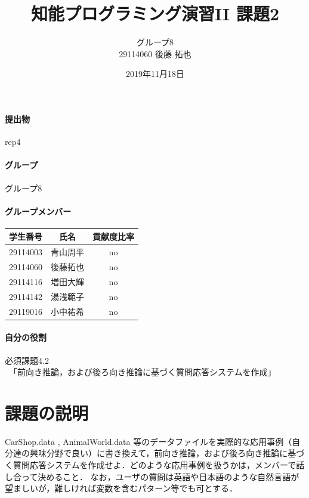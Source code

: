 \documentclass[uplatex,12pt]{jsarticle}
\title{知能プログラミング演習II 課題2}
\author{グループ8\\
  29114060 後藤 拓也\\
}
\date{2019年11月18日}
\begin{document}
\maketitle

\paragraph{提出物} rep4

\paragraph{グループ} グループ8

\paragraph{グループメンバー}
\begin{center}
\begin{tabular}{|c|c|c|}
  \hline
  学生番号&氏名&貢献度比率\\
  \hline\hline
  29114003&青山周平&no\\
  \hline
  29114060&後藤拓也&no\\
  \hline
  29114116&増田大輝&no\\
  \hline
  29114142&湯浅範子&no\\
  \hline
  29119016&小中祐希&no\\
  \hline
\end{tabular}
\end{center}
\paragraph{自分の役割} 必須課題4.2
\\　「前向き推論，および後ろ向き推論に基づく質問応答システムを作成」
\section{課題の説明}
\begin{screen}
CarShop.data , AnimalWorld.data 等のデータファイルを実際的な応用事例（自分達の興味分野で良い）に書き換えて，前向き推論，および後ろ向き推論に基づく質問応答システムを作成せよ．どのような応用事例を扱うかは，メンバーで話し合って決めること．
なお，ユーザの質問は英語や日本語のような自然言語が望ましいが，難しければ変数を含むパターン等でも可とする．
\end{screen}
\end{document}
